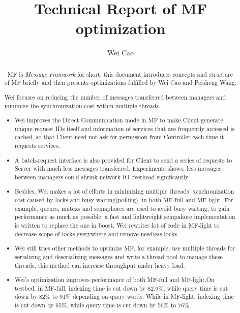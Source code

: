 \documentclass[a4paper,10pt]{article}
\begin{document}

\title{Technical Report of MF optimization}
\author{Wei Cao}
\maketitle
\begin{abstract}\
MF is \emph{Message Framwork} for short, this document introduces concepts and structure of MF briefly and then presents optimizations fulfilled by Wei Cao and Peisheng Wang.

Wei focuses on reducing the number of messages transferred between managers and minimize the synchronization cost within multiple threads.
\begin{itemize}
\item Wei improves the Direct Communication mode in MF to make Client generate unique request IDs itself and information of services that are frequently accessed is cached,
so that Client need not ask for permission from Controller each time it requests services.
\item A batch-request interface is also provided for Client to send a series of requests to Server with much less messages transferred.
Experiments shows, less messages between managers could shrink network IO overhead significantly.
\item Besides, Wei makes a lot of efforts in minimizing multiple threads' synchronization cost caused by locks and busy waiting(polling), in both MF-full and MF-light.
For example, queues, mutexs and semaphores are used to avoid busy waiting, to gain performance as much as possible, a fast and lightweight sempahore implementation is written to replace the one in boost.
Wei rewrites lot of code in MF-light to decrease scope of locks everywhere and remove needless locks.
\item Wei still tries other methods to optimize MF, for example, use multiple threads for serializing and deserializing messages and write a thread pool to manage these threads,
this method can increase throughput under heavy load.
\item Wei's optimization improves performance of both MF-full and MF-light.On testbed, in MF-full, indexing time is cut down by 82.9\%, while query time is cut down by 82\% to 91\% depending on query words.
While in MF-light, indexing time is cut down by 65\%, while query time is cut down by 56\% to 76\%.
\end{itemize}


\end{abstract}
\end{document}

